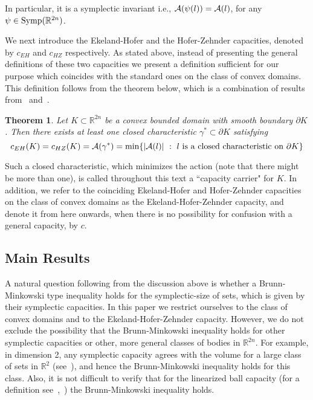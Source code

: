 \documentclass[12pt]{article}
\newtheorem{theorem}[lemma]{Theorem}
\begin{document}
In particular, it is a symplectic invariant i.e., ${\cal A}(\psi(l)) = {\cal A}(l)$, for any  $\psi \in {\rm
Symp}({\mathbb R}^{2n})$.


We next introduce the Ekeland-Hofer and the Hofer-Zehnder
capacities, denoted by $c_{EH}$ and $c_{HZ}$ respectively. As stated
above, instead of presenting the general definitions of these two
capacities we present a definition sufficient for our purpose which
coincides with the standard ones on the class of convex domains.
This definition follows from the theorem below, which is a
combination of results from~\cite{EH} and~\cite{HZ}.

\begin{theorem} \label{Cap_on_covex_sets} Let $K \subset {\mathbb
R}^{2n}$ be a convex bounded domain with smooth boundary $\partial
K$. Then there exists at least one closed characteristic $\gamma^*
\subset \partial K$ satisfying
$$ c_{EH}(K) = c_{HZ}(K) = {\cal A}(\gamma^*) =  \min \{ | {\cal A}(l) | \ : \ l \
{\rm is \ a \ closed \ characteristic \ on  \ } \partial K \}$$
\end{theorem}

Such a closed characteristic, which minimizes the action (note that
there might be more than one), is called throughout this text a
``capacity carrier" for $K$. In addition, we refer to the coinciding
Ekeland-Hofer and Hofer-Zehnder capacities on the class of convex
domains as the Ekeland-Hofer-Zehnder capacity, and denote it from
here onwards, when there is no possibility for confusion with a
general capacity, by $c$.


\subsection{Main Results}

A natural question following from the discussion above is whether a
Brunn-Minkowski type inequality holds for the symplectic-size of
sets, which is given by their symplectic capacities. In this paper
we restrict ourselves to the class of convex domains and to the
Ekeland-Hofer-Zehnder capacity. However, we do not exclude the
possibility that the Brunn-Minkowski inequality holds for other
symplectic capacities or other, more general classes of
bodies in ${\mathbb R}^{2n}$. For example, in dimension 2, %
any symplectic capacity agrees with the volume for a large class of
sets in ${\mathbb R}^2$ (see~\cite{Sib}), and hence the
Brunn-Minkowski inequality holds for this class. Also, it is not
difficult to verify that for the linearized ball capacity (for a
definition see~\cite{AMO},~\cite{AO}) the Brunn-Minkowski inequality
holds.
\end{document}
